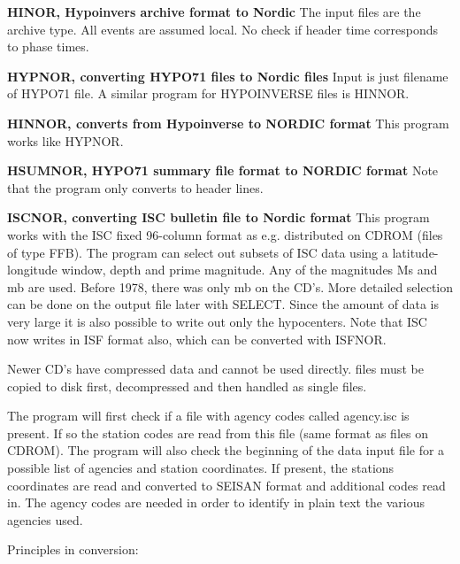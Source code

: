 \textbf{HINOR, Hypoinvers archive format to Nordic}\newline
The input files are the archive type. All events are assumed local.
No check if header time corresponds to phase times. 

\textbf{HYPNOR, converting HYPO71 files to Nordic files}
\newline
{}
Input is just filename of HYPO71 file. A similar program for HYPOINVERSE files is HINNOR. 

\textbf{HINNOR, converts from Hypoinverse to NORDIC format} \newline
{} This program works like HYPNOR. 

\textbf{HSUMNOR, HYPO71 summary file format to NORDIC format } \newline
Note that the program only converts to header lines. 

\textbf{ISCNOR, converting ISC bulletin file to Nordic format } \newline
This program works with the ISC fixed 96-column format as e.g. distributed on CDROM (files of type FFB). The program can select out subsets of ISC data using a latitude-longitude window, depth and prime magnitude. Any of the magnitudes Ms and mb are used. Before 1978, there was only mb on the CD's. More detailed selection can be done on the output file later with SELECT. Since the amount of data is very large it is also possible to write out only the hypocenters. Note that ISC now writes in ISF format also, which can be converted with ISFNOR. 

Newer CD's have compressed data and cannot be used directly. files must be copied to disk first, decompressed and then handled as single files.  

The program will first check if a file with agency codes called agency.isc is present. If so the station codes are read from this file (same format as files on CDROM). The program will also check the beginning of the data input file for a possible list of agencies and station coordinates. If present, the stations coordinates are read and converted to SEISAN format and additional codes read in. The agency codes are needed in order to identify in plain text the various agencies used. 

Principles in conversion: 

